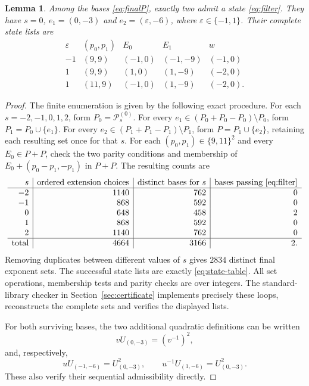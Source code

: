 \documentclass[11pt,a4paper]{article}
\newtheorem{lemma}[theorem]{Lemma}
\newcommand{\Pset}{\mathcal P}
\begin{document}
\begin{lemma}\label{lem:enumeration}
Among the bases \eqref{eq:finalP}, exactly two admit a state
\eqref{eq:filter}. They have $s=0$, $e_1=(0,-3)$ and
$e_2=(\varepsilon,-6)$, where $\varepsilon\in\{-1,1\}$.
Their complete state lists are
\begin{equation}\label{eq:state-table}
\begin{array}{c|c|c|c|c}
\varepsilon&(p_0,p_1)&E_0&E_1&w\\\hline
-1&(9,9)&(-1,0)&(-1,-9)&(-1,0)\\
 1&(9,9)&(1,0)&(1,-9)&(-2,0)\\
 1&(11,9)&(-1,0)&(1,-9)&(-2,0).
\end{array}
\end{equation}
\end{lemma}
\begin{proof}
The finite enumeration is given by the following exact procedure.
For each $s=-2,-1,0,1,2$, form $P_0=\Pset_s^{(0)}$.
For every $e_1\in(P_0+P_0-P_0)\setminus P_0$, form
$P_1=P_0\cup\{e_1\}$. For every
$e_2\in(P_1+P_1-P_1)\setminus P_1$, form
$P=P_1\cup\{e_2\}$, retaining each resulting set once for that
$s$. For each $(p_0,p_1)\in\{9,11\}^2$ and every
$E_0\in P+P$, check the two parity conditions and membership of
$E_0+(p_0-p_1,-p_1)$ in $P+P$. The resulting counts are
\[
\begin{array}{r|r|r|r}
s&\text{ordered extension choices}&\text{distinct bases for }s
 &\text{bases passing \eqref{eq:filter}}\\\hline
-2&1140&762&0\\
-1&868&592&0\\
 0&648&458&2\\
 1&868&592&0\\
 2&1140&762&0\\\hline
\text{total}&4664&3166&2.
\end{array}
\]
Removing duplicates between different values of $s$ gives $2834$
distinct final exponent sets. The successful state lists are exactly
\eqref{eq:state-table}. All set operations, membership tests and
parity checks are over integers. The standard-library checker in
Section~\ref{sec:certificate} implements precisely these loops,
reconstructs the complete sets and verifies the displayed lists.

For both surviving bases, the two additional quadratic definitions
can be written
\[
                  vU_{(0,-3)}=(v^{-1})^2,
\]
and, respectively,
\[
 uU_{(-1,-6)}=U_{(0,-3)}^2,
 \qquad u^{-1}U_{(1,-6)}=U_{(0,-3)}^2.
\]
These also verify their sequential admissibility directly.
\end{proof}
\end{document}
